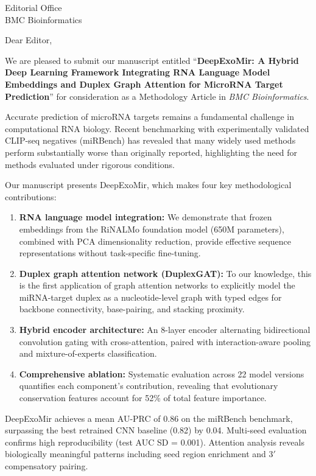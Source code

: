 \documentclass[11pt]{letter}
\begin{document}
\begin{letter}{Editorial Office\\BMC Bioinformatics}

\opening{Dear Editor,}

We are pleased to submit our manuscript entitled ``\textbf{DeepExoMir: A Hybrid Deep Learning Framework Integrating RNA Language Model Embeddings and Duplex Graph Attention for MicroRNA Target Prediction}'' for consideration as a Methodology Article in \textit{BMC Bioinformatics}.

Accurate prediction of microRNA targets remains a fundamental challenge in computational RNA biology. Recent benchmarking with experimentally validated CLIP-seq negatives (miRBench) has revealed that many widely used methods perform substantially worse than originally reported, highlighting the need for methods evaluated under rigorous conditions.

Our manuscript presents DeepExoMir, which makes four key methodological contributions:

\begin{enumerate}
\item \textbf{RNA language model integration:} We demonstrate that frozen embeddings from the RiNALMo foundation model (650M parameters), combined with PCA dimensionality reduction, provide effective sequence representations without task-specific fine-tuning.

\item \textbf{Duplex graph attention network (DuplexGAT):} To our knowledge, this is the first application of graph attention networks to explicitly model the miRNA-target duplex as a nucleotide-level graph with typed edges for backbone connectivity, base-pairing, and stacking proximity.

\item \textbf{Hybrid encoder architecture:} An 8-layer encoder alternating bidirectional convolution gating with cross-attention, paired with interaction-aware pooling and mixture-of-experts classification.

\item \textbf{Comprehensive ablation:} Systematic evaluation across 22 model versions quantifies each component's contribution, revealing that evolutionary conservation features account for 52\% of total feature importance.
\end{enumerate}

DeepExoMir achieves a mean AU-PRC of 0.86 on the miRBench benchmark, surpassing the best retrained CNN baseline (0.82) by 0.04. Multi-seed evaluation confirms high reproducibility (test AUC SD = 0.001). Attention analysis reveals biologically meaningful patterns including seed region enrichment and 3$'$ compensatory pairing.


\end{letter}
\end{document}
